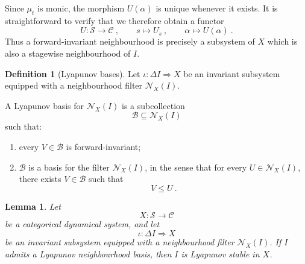 \documentclass[a4paper,reqno,oneside]{amsart}
\newtheorem{lemma}[theorem]{Lemma}
\theoremstyle{definition}
\newtheorem{definition}[theorem]{Definition}
\theoremstyle{remark}
\numberwithin{equation}{section}
\begin{document}
	Since $\mu_t$ is monic, the morphism $U(\alpha)$ is unique whenever it
	exists. It is straightforward to verify that we therefore obtain a functor
	\begin{equation}
		U\colon \mathcal S\to\mathcal C \ , \qquad s \mapsto U_s\ , \qquad \alpha \mapsto U(\alpha) \ .
	\end{equation}
	Thus a forward-invariant neighbourhood is precisely a subsystem of $X$ which is also a stagewise neighbourhood of $I$.
	
	\begin{definition}[Lyapunov bases]\label{def: lyapunov basis}
		Let $\iota\colon \Delta I\Longrightarrow X$ be an invariant subsystem equipped with a neighbourhood filter $\mathcal N_X(I)$.
		
		A Lyapunov basis for $\mathcal N_X(I)$ is a subcollection
		\begin{equation}
			\mathcal B\subseteq \mathcal N_X(I)
		\end{equation}
		such that:
		
		\begin{enumerate}
			\item every $V\in \mathcal B$ is forward-invariant;
			
			\item $\mathcal B$ is a basis for the filter $\mathcal N_X(I)$, in the sense that for every $U \in \mathcal N_X(I)$,
			there exists $V \in \mathcal B$
			such that
			\begin{equation}
				V \leq U \ .
			\end{equation}
		\end{enumerate}
	\end{definition}
	
	
	
	
	\begin{lemma}\label{prop: Lyapunov stability}
		Let
		\begin{equation}
			X\colon\mathcal S\to\mathcal C
		\end{equation}
		be a categorical dynamical system, and let
		\begin{equation}
			\iota\colon \Delta I\Longrightarrow X
		\end{equation}
		be an invariant subsystem equipped with a neighbourhood filter
		$\mathcal N_X(I)$. If $I$ admits a Lyapunov neighbourhood basis, then $I$ is
		Lyapunov stable in $X$.
	\end{lemma}
	
\end{document}
